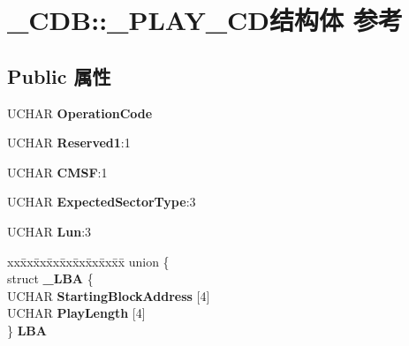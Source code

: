 \hypertarget{struct___c_d_b_1_1___p_l_a_y___c_d}{}\section{\+\_\+\+C\+DB\+:\+:\+\_\+\+P\+L\+A\+Y\+\_\+\+C\+D结构体 参考}
\label{struct___c_d_b_1_1___p_l_a_y___c_d}
\subsection*{Public 属性}
\begin{DoxyCompactItemize}
\item 
\mbox{\label{struct___c_d_b_1_1___p_l_a_y___c_d_a805ad37801bf09d4ffe843234bb16602}} 
U\+C\+H\+AR {\bfseries Operation\+Code}
\item 
\mbox{\label{struct___c_d_b_1_1___p_l_a_y___c_d_a6387fc3d05862dc5b033cc58077dd031}} 
U\+C\+H\+AR {\bfseries Reserved1}\+:1
\item 
\mbox{\label{struct___c_d_b_1_1___p_l_a_y___c_d_a3bde37d236ccbc7d3553d9629ac8b1df}} 
U\+C\+H\+AR {\bfseries C\+M\+SF}\+:1
\item 
\mbox{\label{struct___c_d_b_1_1___p_l_a_y___c_d_a663b26796b3895f19bed52ae1e646b3b}} 
U\+C\+H\+AR {\bfseries Expected\+Sector\+Type}\+:3
\item 
\mbox{\label{struct___c_d_b_1_1___p_l_a_y___c_d_a4bb6094a68bf310cab9400e15ad53a5c}} 
U\+C\+H\+AR {\bfseries Lun}\+:3
\item 
\mbox{\label{struct___c_d_b_1_1___p_l_a_y___c_d_ad4ee81b809885b789369549f02ea1675}} 
\begin{tabbing}
xx\=xx\=xx\=xx\=xx\=xx\=xx\=xx\=xx\=\kill
union \{\\
\>struct {\bfseries \_LBA} \{\\
\>\>UCHAR {\bfseries StartingBlockAddress} \mbox{[}4\mbox{]}\\
\>\>UCHAR {\bfseries PlayLength} \mbox{[}4\mbox{]}\\
\>\} {\bfseries LBA}\\

\end{tabbing}
\end{DoxyCompactItemize}
